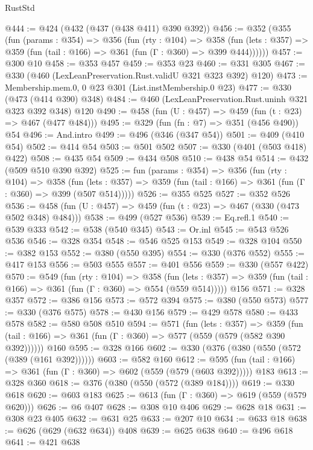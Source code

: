 \begin{lexlean}{RustStd}
\begin{coremodule}
@444 := @424 (@432 (@437 (@438 @411) @390 @392))
@456 := @352
    (@355
      (fun (params : @354) =>
      @356
        (fun (rty : @104) =>
        @358
          (fun (lets : @357) => @359 (fun (tail : @166) => @361 (fun (Γ : @360) => @399 @444))))))
@457 := @300 @10
@458 := @353 @457
@459 := @353 @23
@460 := @331 @305
@467 := @330 (@460 (LexLeanPreservation.Rust.validU @321 @323 @392) @120)
@473 := Membership.mem.{0, 0} @23 @301 (List.instMembership.{0} @23)
@477 := @330 (@473 (@414 @390) @348)
@484 := @460 (LexLeanPreservation.Rust.uninh @321 @323 @392 @348) @120
@490 := @458 (fun (U : @457) => @459 (fun (t : @23) => @467 (@477 @484)))
@495 := @329 (fun (fn : @7) => @351 (@456 @490)) @54
@496 := And.intro
@499 := @496 (@346 (@347 @54))
@501 := @409 (@410 @54)
@502 := @414 @54
@503 := @501 @502
@507 := @330 (@401 (@503 @418) @422)
@508 := @435 @54
@509 := @434 @508
@510 := @438 @54
@514 := @432 (@509 @510 @390 @392)
@525 := fun (params : @354) =>
  @356
    (fun (rty : @104) =>
    @358
      (fun (lets : @357) => @359 (fun (tail : @166) => @361 (fun (Γ : @360) => @399 (@507 @514)))))
@526 := @355 @525
@527 := @352 @526
@536 := @458 (fun (U : @457) => @459 (fun (t : @23) => @467 (@330 (@473 @502 @348) @484)))
@538 := @499 (@527 @536)
@539 := Eq.refl.{1}
@540 := @539 @333
@542 := @538 (@540 @345)
@543 := Or.inl
@545 := @543 @526 @536
@546 := @328 @354
@548 := @546 @525 @153
@549 := @328 @104
@550 := @382 @153
@552 := @380 (@550 @395)
@554 := @330 (@376 @552)
@555 := @417 @153
@556 := @503 @555
@557 := @401 @556
@559 := @330 (@557 @422)
@570 := @549
    (fun (rty : @104) =>
    @358
      (fun (lets : @357) => @359 (fun (tail : @166) => @361 (fun (Γ : @360) => @554 (@559 @514)))))
    @156
@571 := @328 @357
@572 := @386 @156
@573 := @572 @394
@575 := @380 (@550 @573)
@577 := @330 (@376 @575)
@578 := @430 @156
@579 := @429 @578
@580 := @433 @578
@582 := @580 @508 @510
@594 := @571
    (fun (lets : @357) =>
    @359 (fun (tail : @166) => @361 (fun (Γ : @360) => @577 (@559 (@579 (@582 @390 @392))))))
    @160
@595 := @328 @166
@602 := @330 (@376 (@380 (@550 (@572 (@389 (@161 @392))))))
@603 := @582 @160
@612 := @595 (fun (tail : @166) => @361 (fun (Γ : @360) => @602 (@559 (@579 (@603 @392))))) @183
@613 := @328 @360
@618 := @376 (@380 (@550 (@572 (@389 @184))))
@619 := @330 @618
@620 := @603 @183
@625 := @613 (fun (Γ : @360) => @619 (@559 (@579 @620)))
@626 := @6 @407
@628 := @308 @10 @406
@629 := @628 @18
@631 := @308 @23 @405
@632 := @631 @25
@633 := @207 @10
@634 := @633 @18
@638 := @626 (@629 (@632 @634)) @408
@639 := @625 @638
@640 := @496 @618
@641 := @421 @638

\end{coremodule}
\end{lexlean}
